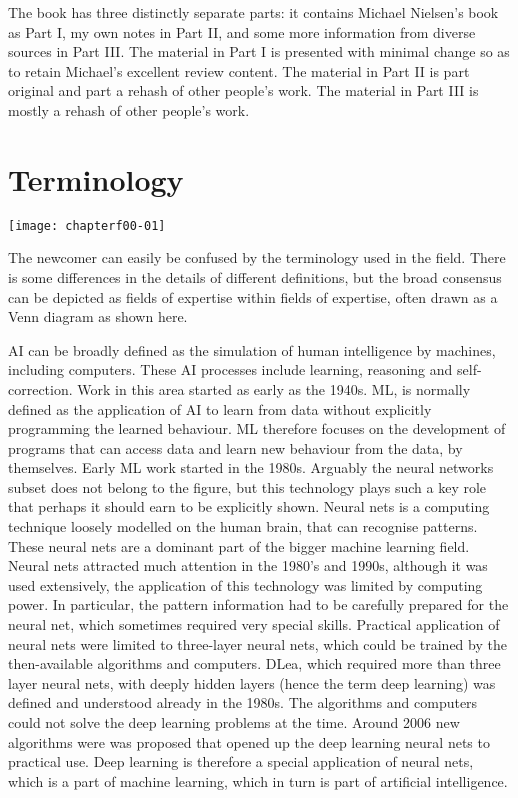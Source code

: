 The book has three distinctly separate parts: it contains Michael Nielsen's book as Part I, my own notes in Part II, and some more information from diverse sources in Part III.  The material in Part I is presented with minimal change so as to retain Michael's excellent review content.  The material in Part II is part original and part a rehash of other people's work. The material in Part III is mostly a rehash of other people's work.

\section*{Terminology}

\begin{marginfigure}
\texttt{[image: chapterf00-01]}
\end{marginfigure}

The newcomer can easily be confused by the terminology used in the field.  There is some differences in the details of different definitions, but the broad consensus can be depicted as fields of expertise within fields of expertise, often drawn as a Venn diagram as shown here.

\ac{AI} can be broadly defined as the simulation of human intelligence by machines, including computers. These \ac{AI} processes include learning, reasoning and self-correction. Work in this area started as early as the 1940s. \ac{ML}\cite{WikiPediaMachineLearning2019,DanielFaggella2019}, is normally defined as the application of \ac{AI} to learn from data without explicitly programming the learned behaviour. \ac{ML} therefore focuses on the development of programs that can access data and learn new behaviour from the data, by themselves.  Early ML work started in the 1980s. Arguably the neural networks subset does not belong to the figure, but this technology plays such a key role that perhaps it should earn to be explicitly shown.  Neural nets is a computing technique loosely modelled on the human brain, that can  recognise patterns.  These neural nets are a dominant part of the bigger machine learning field. Neural nets attracted much attention in the 1980's and 1990s, although it was used extensively, the application of this technology was limited by computing power.  In particular, the pattern information had to be carefully prepared for the neural net, which sometimes required very special skills. Practical application of neural nets were limited to three-layer neural nets, which could be trained by the then-available algorithms and computers.  \ac{DLea}\cite{WikiPediaDeepLearning2019}, which required more than three layer neural nets, with deeply hidden layers (hence the term deep learning) was defined and understood already in the 1980s.  The algorithms and computers could not solve the deep learning problems at the time.   Around 2006 new algorithms were was proposed that opened up the deep learning neural nets to practical use.
Deep learning is therefore a special application of neural nets, which is a part of machine learning, which in turn is part of artificial intelligence.

